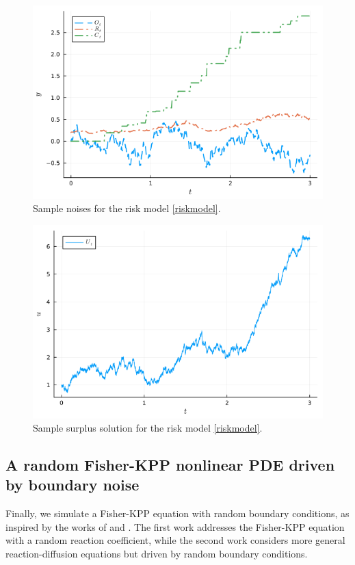 \documentclass[reqno,12pt]{amsart}
\theoremstyle{plain} %
\theoremstyle{definition} %
\begin{document}
\begin{figure}[htb]
    \includegraphics[scale=0.4]{img/riskmodel_noises.png}
    \caption{Sample noises for the risk model \eqref{riskmodel}.}
    \label{figriskmodelnoise}
\end{figure}

\begin{figure}[htb]
    \includegraphics[scale=0.4]{img/riskmodel_surplus.png}
    \caption{Sample surplus solution for the risk model \eqref{riskmodel}.}
    \label{figriskmodelsurplus}
\end{figure}

\subsection{A random Fisher-KPP nonlinear PDE driven by boundary noise}

Finally, we simulate a Fisher-KPP equation with random boundary conditions, as inspired by the works of \cite{SalakoShen2020}  and \cite{FreidlinWentzell1992}. The first work addresses the Fisher-KPP equation with a random reaction coefficient, while the second work considers more general reaction-diffusion equations but driven by random boundary conditions.
\end{document}
